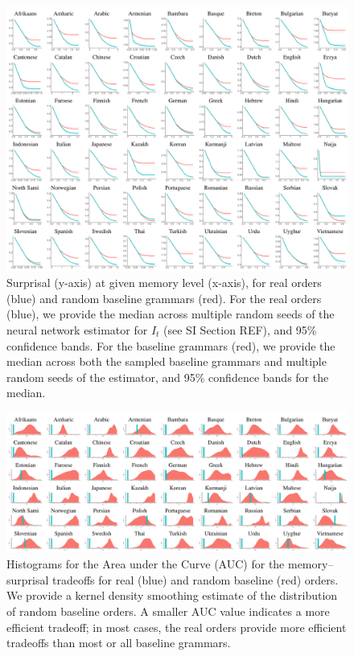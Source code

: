 \begin{figure}
	\begin{center}
\includegraphics[width=\textwidth]{results-table.pdf}
\end{center}
	\caption{Surprisal (y-axis) at given memory level (x-axis), for real orders (blue) and random baseline grammars (red).
	For the real orders (blue), we provide the median across multiple random seeds of the neural network estimator for $I_t$ (see SI Section REF), and 95\% confidence bands.
	For the baseline grammars (red), we provide the median across both the sampled baseline grammars and multiple random seeds of the estimator, and 95\% confidence bands for the median.
}\label{fig:median-table}
\end{figure}


\begin{figure}
	\begin{center}
\includegraphics[width=\textwidth]{auc-table.pdf}
\end{center}
\caption{Histograms for the Area under the Curve (AUC) for the memory--surprisal tradeoffs for real (blue) and random baseline (red) orders.
We provide a kernel density smoothing estimate of the distribution of random baseline orders.
A smaller AUC value indicates a more efficient tradeoff; in most cases, the real orders provide more efficient tradeoffs than most or all baseline grammars.
}\label{fig:auc}
\end{figure}







